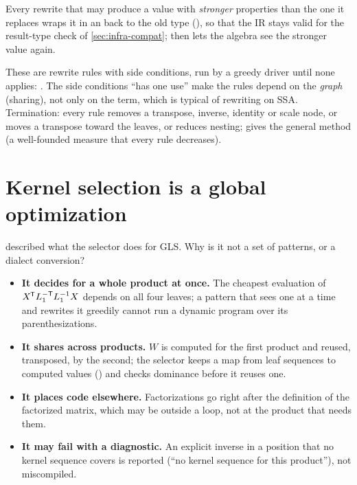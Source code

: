 Every rewrite that may produce a value with \emph{stronger} properties than
the one it replaces wraps it in an  back to the old type
(), so that the IR stays valid for the result-type
check of \cref{sec:infra-compat};  then lets the
algebra see the stronger value again.

\begin{theory}
These are rewrite rules with side conditions, run by a greedy driver until
none applies: . The side conditions ``has one use'' make the rules depend on the
\emph{graph} (sharing), not only on the term, which is typical of rewriting
on SSA. Termination: every rule removes a transpose, inverse, identity or
scale node, or moves a transpose toward the leaves, or reduces nesting;
 gives
the general method (a well-founded measure that every rule decreases).
\end{theory}

\section{Kernel selection is a global optimization}
\label{sec:kernels-select}

 described what the selector does for GLS. Why is it
not a set of patterns, or a dialect conversion?

\begin{itemize}
\item \textbf{It decides for a whole product at once.} The cheapest
  evaluation of \(X^{\mkern-1.5mu\mathsf{T}} L_1^{-\mathsf{T}} L_1^{-1} X\) depends on all four leaves; a
  pattern that sees one  at a time and rewrites it greedily
  cannot run a dynamic program over its parenthesizations.
\item \textbf{It shares across products.} \(W\) is computed for the first
  product and reused, transposed, by the second; the selector keeps a map
  from leaf sequences to computed values () and checks
  dominance before it reuses one.
\item \textbf{It places code elsewhere.} Factorizations go right after the
  definition of the factorized matrix, which may be outside a loop, not at
  the product that needs them.
\item \textbf{It may fail with a diagnostic.} An explicit inverse in a
  position that no kernel sequence covers is reported (``no kernel sequence
  for this product''), not miscompiled.
\end{itemize}

